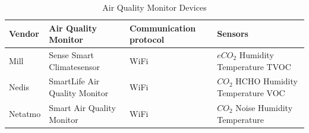 \begin{table}[!hbtp]
    \centering
    \begin{adjustbox}{width=1\textwidth}
    \begin{tabular}{| p{3cm} | p{5cm} | p{5cm} | p{3cm} |} 
        \hline
        \textbf{Vendor} & \textbf{Air Quality Monitor} & \textbf{Communication protocol} & \textbf{Sensors} \\
        \hline
        Mill & Sense Smart Climatesensor & WiFi & \(eCO_2\) \newline Humidity \newline Temperature \newline TVOC \\
        \hline
        Nedis & SmartLife Air Quality Monitor & WiFi & \(CO_2\) \newline HCHO \newline Humidity \newline Temperature \newline VOC \\
        \hline
        Netatmo & Smart Air Quality Monitor & WiFi & \(CO_2\) \newline Noise \newline Humidity \newline Temperature \\
        \hline
    \end{tabular}
    \end{adjustbox}
    \caption{Air Quality Monitor Devices}
    \label{tab:AQMSurvey}
\end{table}
\FloatBarrier


